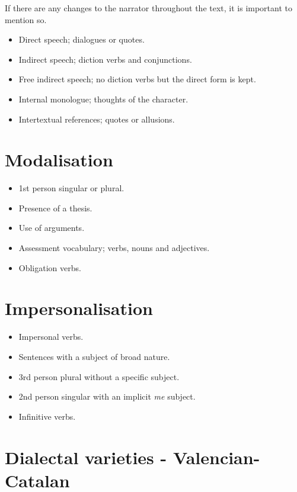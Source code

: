 \documentclass{article}
\begin{document}
If there are any changes to the narrator throughout the text, it is important to
mention so.

\begin{itemize}
    \item Direct speech; dialogues or quotes.
    \item Indirect speech; diction verbs and conjunctions.
    \item Free indirect speech; no diction verbs but the direct form is kept.
    \item Internal monologue; thoughts of the character.
    \item Intertextual references; quotes or allusions.
\end{itemize}

\section*{Modalisation}

\begin{itemize}
    \item 1st person singular or plural.
    \item Presence of a thesis.
    \item Use of arguments.
    \item Assessment vocabulary; verbs, nouns and adjectives.
    \item Obligation verbs.
\end{itemize}

\section*{Impersonalisation}

\begin{itemize}
    \item Impersonal verbs.
    \item Sentences with a subject of broad nature.
    \item 3rd person plural without a specific subject.
    \item 2nd person singular with an implicit \emph{me} subject.
    \item Infinitive verbs.
\end{itemize}

\section*{Dialectal varieties - Valencian-Catalan}
\end{document}
